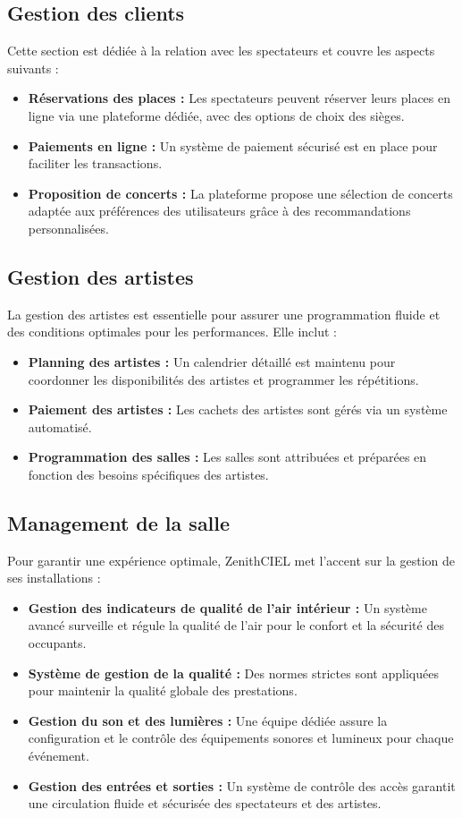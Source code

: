 \documentclass[french, 12pt]{article}%
\newcommand{\itemE}{\item[$\bullet$]}
\begin{document}
\subsection{Gestion des clients}
Cette section est dédiée à la relation avec les spectateurs et couvre les aspects suivants :
\begin{itemize}
    \itemE \textbf{Réservations des places :} Les spectateurs peuvent réserver leurs places en ligne via une plateforme dédiée, avec des options de choix des sièges.
    \itemE \textbf{Paiements en ligne :} Un système de paiement sécurisé est en place pour faciliter les transactions.
    \itemE \textbf{Proposition de concerts :} La plateforme propose une sélection de concerts adaptée aux préférences des utilisateurs grâce à des recommandations personnalisées.
\end{itemize}

\subsection{Gestion des artistes}
La gestion des artistes est essentielle pour assurer une programmation fluide et des conditions optimales pour les performances. Elle inclut :
\begin{itemize}
    \itemE \textbf{Planning des artistes :} Un calendrier détaillé est maintenu pour coordonner les disponibilités des artistes et programmer les répétitions.
    \itemE \textbf{Paiement des artistes :} Les cachets des artistes sont gérés via un système automatisé.
    \itemE \textbf{Programmation des salles :} Les salles sont attribuées et préparées en fonction des besoins spécifiques des artistes.
\end{itemize}

\subsection{Management de la salle}
Pour garantir une expérience optimale, ZenithCIEL met l'accent sur la gestion de ses installations :
\begin{itemize}
    \itemE \textbf{Gestion des indicateurs de qualité de l'air intérieur :} Un système avancé surveille et régule la qualité de l'air pour le confort et la sécurité des occupants.
    \itemE \textbf{Système de gestion de la qualité :} Des normes strictes sont appliquées pour maintenir la qualité globale des prestations.
    \itemE \textbf{Gestion du son et des lumières :} Une équipe dédiée assure la configuration et le contrôle des équipements sonores et lumineux pour chaque événement.
    \itemE \textbf{Gestion des entrées et sorties :} Un système de contrôle des accès garantit une circulation fluide et sécurisée des spectateurs et des artistes.
\end{itemize}
\end{document}
